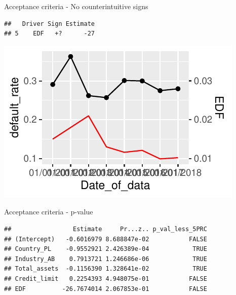 \documentclass[9pt,ignorenonframetext,]{beamer}
\newenvironment{Shaded}{\begin{snugshade}}{\end{snugshade}}
\newcommand{\KeywordTok}[1]{\textcolor[rgb]{0.13,0.29,0.53}{\textbf{#1}}}
\newcommand{\DecValTok}[1]{\textcolor[rgb]{0.00,0.00,0.81}{#1}}
\newcommand{\FloatTok}[1]{\textcolor[rgb]{0.00,0.00,0.81}{#1}}
\newcommand{\StringTok}[1]{\textcolor[rgb]{0.31,0.60,0.02}{#1}}
\newcommand{\OperatorTok}[1]{\textcolor[rgb]{0.81,0.36,0.00}{\textbf{#1}}}
\newcommand{\NormalTok}[1]{#1}
\begin{document}
\begin{frame}[fragile]{Acceptance criteria - No counterintuitive signs}

\begin{verbatim}
##   Driver Sign Estimate
## 5    EDF   +?      -27
\end{verbatim}

\includegraphics{Risk-Models-Development-Process_files/figure-beamer/unnamed-chunk-56-1.pdf}

\end{frame}

\begin{frame}[fragile]{Acceptance criteria - p-value}

\begin{Shaded}
\end{Shaded}

\begin{verbatim}
##                 Estimate     Pr...z.. p_val_less_5PRC
## (Intercept)   -0.6016979 8.688847e-02           FALSE
## Country_PL    -0.9552921 2.426389e-04            TRUE
## Industry_AB    0.7913721 1.246686e-06            TRUE
## Total_assets  -0.1156390 1.328641e-02            TRUE
## Credit_limit   0.2254393 4.948075e-01           FALSE
## EDF          -26.7674014 2.067853e-01           FALSE
\end{verbatim}

\end{frame}
\end{document}
